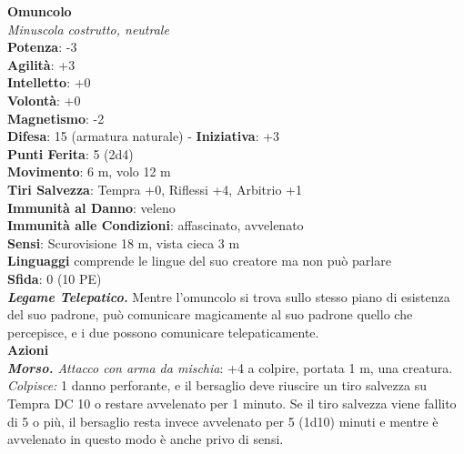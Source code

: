 \begin{multicols}{2}
\medskip\textbf{Omuncolo}\\
\emph{Minuscola costrutto, neutrale}\\
\textbf{Potenza}: -3\\
\textbf{Agilità}: +3\\
\textbf{Intelletto}: +0\\
\textbf{Volontà}: +0\\
\textbf{Magnetismo}: -2\\
\textbf{Difesa}: 15 (armatura naturale) - \textbf{Iniziativa}: +3\\
\textbf{Punti Ferita}: 5 (2d4)\\
\textbf{Movimento}: 6 m, volo 12 m\\
\textbf{Tiri Salvezza}:  Tempra +0, Riflessi +4, Arbitrio +1\\
\textbf{Immunità al Danno}: veleno\\
\textbf{Immunità alle Condizioni}: affascinato, avvelenato\\
\textbf{Sensi}: Scurovisione 18 m, vista cieca 3 m\\
\textbf{Linguaggi} comprende le lingue del suo creatore ma non può parlare\\
\textbf{Sfida}: 0 (10 PE)\smallskip\\
\emph{\textbf{Legame Telepatico.}} Mentre l'omuncolo si trova sullo stesso piano di esistenza del suo padrone, può comunicare magicamente al suo padrone quello che percepisce, e i due possono comunicare telepaticamente.\\
\smallskip\textbf{Azioni}\\
\emph{\textbf{Morso.} Attacco con arma da mischia}: +4 a colpire, portata 1 m, una creatura.\\
\emph{Colpisce:} 1 danno perforante, e il bersaglio deve riuscire un tiro salvezza su Tempra DC 10 o restare avvelenato per 1 minuto. Se il tiro salvezza viene fallito di 5 o più, il bersaglio resta invece avvelenato per 5 (1d10) minuti e mentre è avvelenato in questo modo è anche privo di sensi.\\


\end{multicols}
